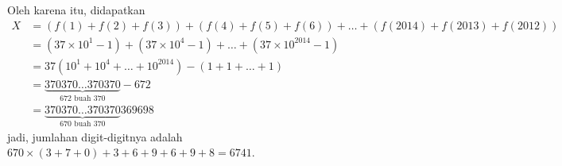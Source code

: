 \documentclass[11pt]{scrartcl}
\begin{document}
\begin{enumerate}[resume]
\begin{solusi}
        Oleh karena itu, didapatkan 
        \begin{align*}
        X &= (f(1)+f(2)+f(3))+(f(4)+f(5)+f(6))+\dots+(f(2014)+f(2013)+f(2012)) \\
        &= (37 \times 10^1 -1)+(37 \times 10^4 -1)+ \dots + (37 \times 10^{2014}-1)\\
        &= 37(10^1+10^4+\dots+10^{2014})-(1+1+\dots+1)\\
        &= \underbrace{370370\dots 370370}_{672 \text{ buah } 370} - 672\\
        &= \underbrace{370370\dots 370370}_{670 \text{ buah } 370}369698
        \end{align*}
        jadi, jumlahan digit-digitnya adalah $670 \times (3+7+0)+3+6+9+6+9+8=6741$.
    \end{solusi}
	
\end{enumerate}

\newpage
\end{document}
